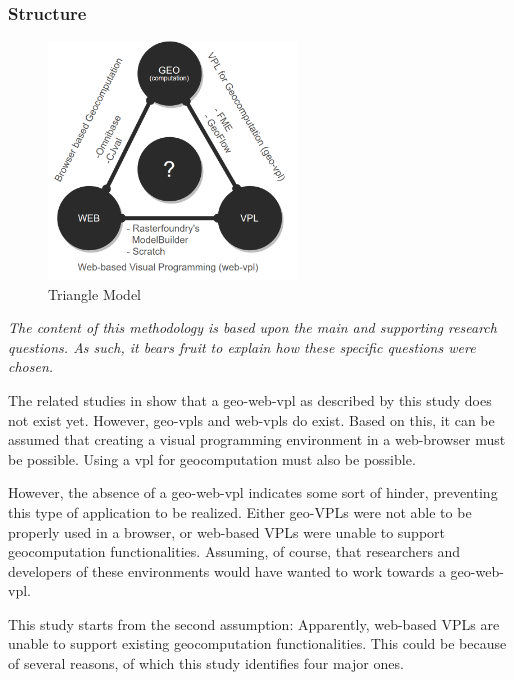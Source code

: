 \subsubsection*{Structure}

\begin{figure}
  \centering
  \graphicspath{ {../../assets/diagrams/} }
  \includegraphics[width=250px]{geo-web-vpl.png}
  \caption{Triangle Model}
  \label{fig:method}
\end{figure}
  
\emph{The content of this methodology is based upon the main and supporting research questions. 
As such, it bears fruit to explain how these specific questions were chosen.}

The related studies in  show that a \ac{geo-web-vpl} as described by this study does not exist yet. However, geo-vpls and web-vpls do exist. 
Based on this, it can be assumed that creating a visual programming environment in a web-browser must be possible. 
Using a \ac*{vpl} for geocomputation must also be possible. 

However, the absence of a geo-web-vpl indicates some sort of hinder, preventing this type of application to be realized. Either geo-VPLs were not able to be properly used in a browser, or web-based VPLs were unable to support geocomputation functionalities. 
Assuming, of course, that researchers and developers of these environments would have wanted to work towards a \ac{geo-web-vpl}.

This study starts from the second assumption: 
Apparently, web-based VPLs are unable to support existing geocomputation functionalities. 
This could be because of several reasons, of which this study identifies four major ones.

